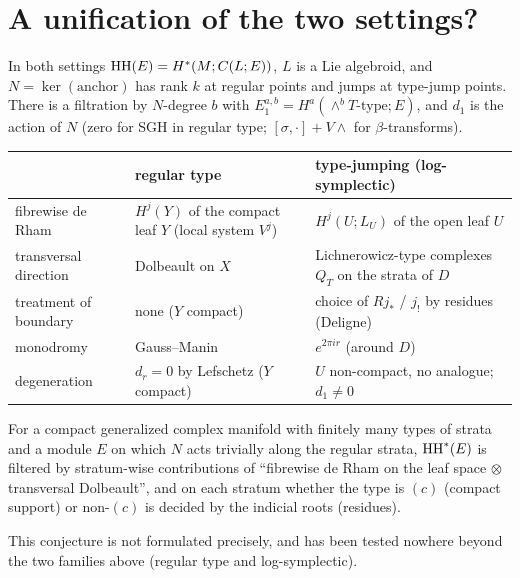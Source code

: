 \section{A unification of the two settings?}\label{p4:sec:unified}
In both settings $\mathrm{HH}(E)=H^*(M;C(L;E))$, $L$ is a Lie algebroid, and $N=\ker(\text{anchor})$ has rank $k$ at regular points and jumps at type-jump points. There is a filtration by $N$-degree $b$ with $E_1^{a,b}=H^a(\wedge^bT\text{-type};E)$, and $d_1$ is the action of $N$ (zero for SGH in regular type; $[\sigma,\cdot]+V\wedge$ for $\beta$-transforms).
\begin{center}\small
\begin{tabular}{p{3.2cm}p{5.4cm}p{5.4cm}}\toprule
 & regular type & type-jumping (log-symplectic)\\\midrule
fibrewise de Rham & $H^j(Y)$ of the compact leaf $Y$ (local system $V^j$) & $H^j(U;L_U)$ of the open leaf $U$ \\\midrule
transversal direction & Dolbeault on $X$ & Lichnerowicz-type complexes $Q_T$ on the strata of $D$\\\midrule
treatment of boundary & none ($Y$ compact) & choice of $Rj_*$ / $j_!$ by residues (Deligne)\\\midrule
monodromy & Gauss--Manin & $e^{2\pi ir}$ (around $D$)\\\midrule
degeneration & $d_r=0$ by Lefschetz ($Y$ compact) & $U$ non-compact, no analogue; $d_1\neq0$\\\bottomrule
\end{tabular}
\end{center}
\begin{conj}\label{p4:conj:U}
For a compact generalized complex manifold with finitely many types of strata and a module $E$ on which $N$ acts trivially along the regular strata, $\mathrm{HH}^*(E)$ is filtered by stratum-wise contributions of ``fibrewise de Rham on the leaf space $\otimes$ transversal Dolbeault'', and on each stratum whether the type is $(c)$ (compact support) or non-$(c)$ is decided by the indicial roots (residues).
\end{conj}
\noindent This conjecture is not formulated precisely, and has been tested nowhere beyond the two families above (regular type and log-symplectic).

